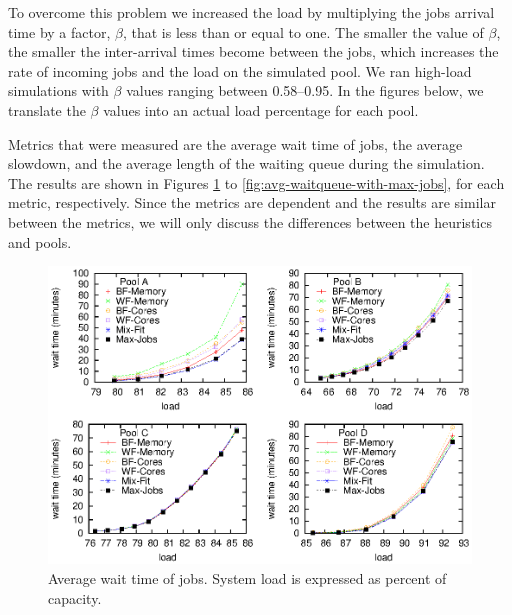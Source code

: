 To overcome this problem we increased the load by multiplying the jobs
arrival time by a factor, $\beta$, that is less than or equal to one.
The smaller the value of $\beta$, the smaller the inter-arrival times
become between the jobs, which increases the rate of incoming jobs and
the load on the simulated pool. 
We ran high-load simulations with $\beta$ 
values ranging between 0.58--0.95. In the figures below, we translate the
$\beta$ values into an actual load percentage for each pool.

Metrics that were measured are the average wait time of jobs, the
average slowdown, and the average length of the waiting queue during the
simulation.
The results are shown in Figures \ref{fig:avg-wait-with-max-jobs} to
\ref{fig:avg-waitqueue-with-max-jobs}, for each metric, respectively.
Since the metrics are dependent and the results are similar between the metrics, 
we will only discuss the differences between the heuristics and pools.




\begin{figure}\centering
	\includegraphics[width=1.0\textwidth]{figures/avg-wait-with-max-jobs.eps}
\caption{Average wait time of jobs.
System load is expressed as percent of capacity.}
\label{fig:avg-wait-with-max-jobs}
\end{figure}

